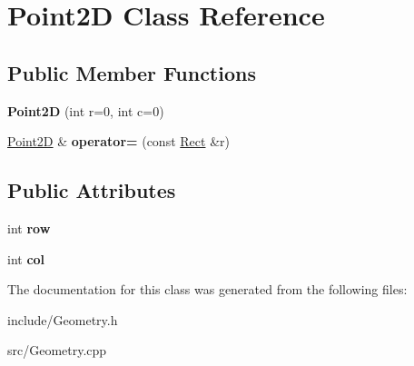 \hypertarget{classPoint2D}{}\section{Point2\+D Class Reference}
\label{classPoint2D}
\subsection*{Public Member Functions}
\begin{DoxyCompactItemize}
\item 
\hypertarget{classPoint2D_ab6b269e58cadf99c3b290a43e04c9576}{}{\bfseries Point2\+D} (int r=0, int c=0)\label{classPoint2D_ab6b269e58cadf99c3b290a43e04c9576}

\item 
\hypertarget{classPoint2D_ab91688dc27a2072ab3efaf068c7a57e0}{}\hyperlink{classPoint2D}{Point2\+D} \& {\bfseries operator=} (const \hyperlink{classRect}{Rect} \&r)\label{classPoint2D_ab91688dc27a2072ab3efaf068c7a57e0}

\end{DoxyCompactItemize}
\subsection*{Public Attributes}
\begin{DoxyCompactItemize}
\item 
\hypertarget{classPoint2D_ab2066342cc783a1ff0f0cf0e8357138a}{}int {\bfseries row}\label{classPoint2D_ab2066342cc783a1ff0f0cf0e8357138a}

\item 
\hypertarget{classPoint2D_af5f355c29cdbafa6e446208824a77b19}{}int {\bfseries col}\label{classPoint2D_af5f355c29cdbafa6e446208824a77b19}

\end{DoxyCompactItemize}


The documentation for this class was generated from the following files\+:\begin{DoxyCompactItemize}
\item 
include/Geometry.\+h\item 
src/Geometry.\+cpp\end{DoxyCompactItemize}
